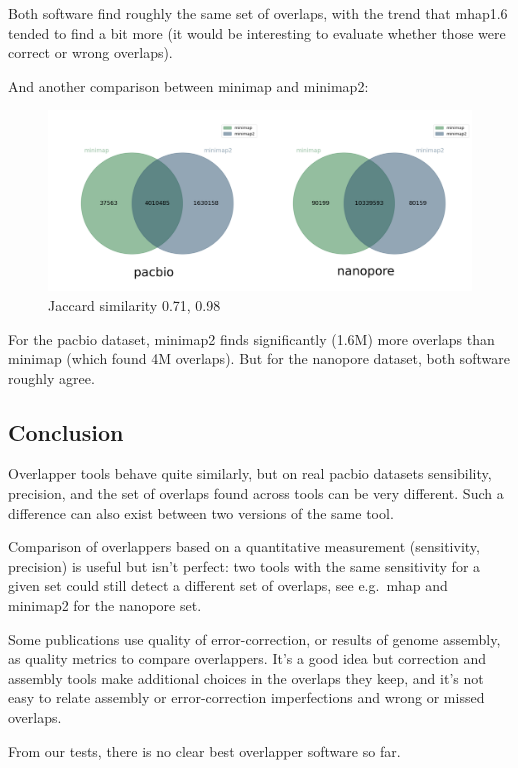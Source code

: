 \documentclass[./main.tex]{subfiles}
\begin{document}
Both software find roughly the same set of overlaps, with the trend that
mhap1.6 tended to find a bit more (it would be interesting to evaluate
whether those were correct or wrong overlaps).

And another comparison between minimap and minimap2:

\begin{figure}[ht]
\centering
\includegraphics[width=\textwidth]{paper/blog_post/minimap_venn.png}
\caption{Jaccard similarity 0.71, 0.98}
\end{figure}


For the pacbio dataset, minimap2 finds significantly (1.6M) more
overlaps than minimap (which found 4M overlaps). But for the nanopore
dataset, both software roughly agree.

\subsection{Conclusion}\label{preassembly:ovl:conclusion}

Overlapper tools behave quite similarly, but on real pacbio
datasets sensibility, precision, and the set of overlaps found across tools can
be very different. Such a difference can also exist between two versions
of the same tool.

Comparison of overlappers based on a quantitative measurement
(sensitivity, precision) is useful but isn't perfect: two tools with the
same sensitivity for a given set could still detect a different set of
overlaps, see e.g.~mhap and minimap2 for the nanopore set.

Some publications use quality of error-correction, or results of genome
assembly, as quality metrics to compare overlappers. It's a good idea
but correction and assembly tools make additional choices in the
overlaps they keep, and it's not easy to relate assembly or
error-correction imperfections and wrong or missed overlaps.

From our tests, there is no clear best overlapper software so far.
\end{document}
